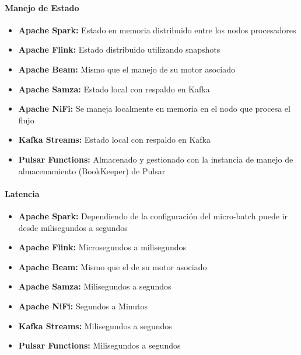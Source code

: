 \paragraph{Manejo de Estado}
\begin{itemize}
    \item \textbf{Apache Spark:} Estado en memoria distribuido entre los nodos procesadores
    \item \textbf{Apache Flink:} Estado distribuido utilizando snapshots
    \item \textbf{Apache Beam:} Mismo que el manejo de su motor asociado 
    \item \textbf{Apache Samza:} Estado local con respaldo en Kafka
    \item \textbf{Apache NiFi:} Se maneja localmente en memoria en el nodo que procesa el flujo
    \item \textbf{Kafka Streams:} Estado local con respaldo en Kafka
    \item \textbf{Pulsar Functions:} Almacenado y gestionado con la instancia de manejo de almacenamiento (BookKeeper) de Pulsar
\end{itemize}

\paragraph{Latencia}
\begin{itemize}
    \item \textbf{Apache Spark:} Dependiendo de la configuración del micro-batch puede ir desde milisegundos a segundos
    \item \textbf{Apache Flink:} Microsegundos a milisegundos
    \item \textbf{Apache Beam:} Mismo que el de su motor asociado 
    \item \textbf{Apache Samza:} Milisegundos a segundos
    \item \textbf{Apache NiFi:} Segundos a Minutos
    \item \textbf{Kafka Streams:} Milisegundos a segundos
    \item \textbf{Pulsar Functions:} Milisegundos a segundos
\end{itemize}

